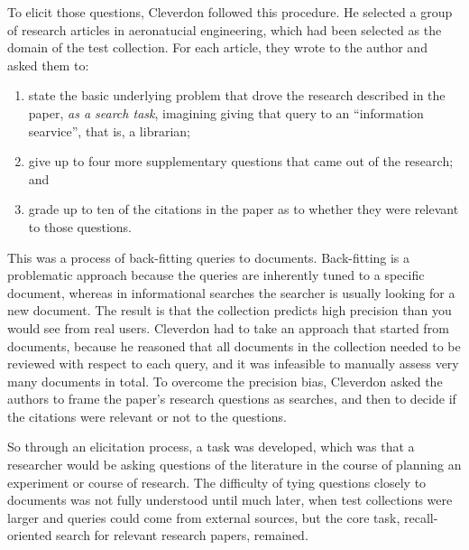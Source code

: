 \documentclass[nobib]{tufte-book}
\begin{document}
To elicit those questions, Cleverdon followed this procedure.  He selected a group of research articles in aeronatucial engineering, which had been selected as the domain of the test collection.  For each article, they wrote to the author and asked them to:
\begin{enumerate}
    \item state the basic underlying problem that drove the research described in the paper, {\em as a search task}, imagining giving that query to an ``information searvice'', that is, a librarian;
    \item give up to four more supplementary questions that came out of the research; and
    \item grade up to ten of the citations in the paper as to whether they were relevant to those questions.
\end{enumerate}

This was a process of back-fitting queries to documents.  Back-fitting is a problematic approach because the queries are inherently tuned to a specific document, whereas in informational searches the searcher is usually looking for a new document.  The result is that the collection predicts high precision than you would see from real users. 
Cleverdon had to take an approach that started from documents, because he reasoned that all documents in the collection needed to be reviewed with respect to each query, and it was infeasible to manually assess very many documents in total.
To overcome the precision bias, Cleverdon asked the authors to frame the paper's research questions as searches, and then to decide if the citations were relevant or not to the questions.

So through an elicitation process, a task was developed, which was that a researcher would be asking questions of the literature in the course of planning an experiment or course of research.  The difficulty of tying questions closely to documents was not fully understood until much later, when test collections were larger and queries could come from external sources, but the core task, recall-oriented search for relevant research papers, remained.
\end{document}
